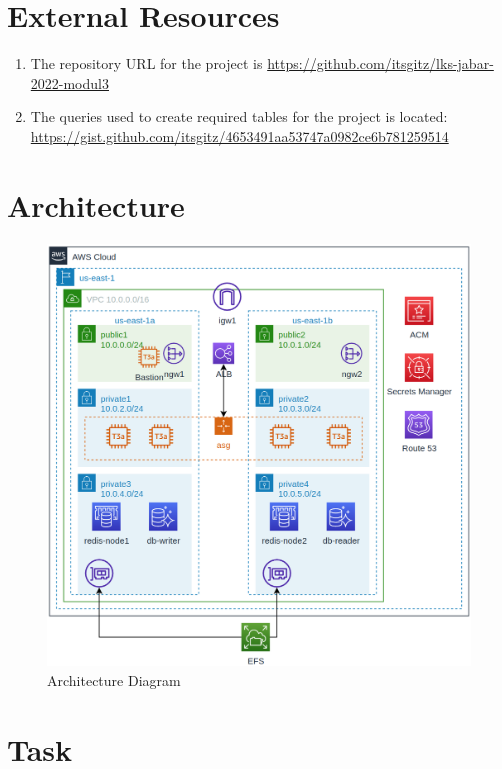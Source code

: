 \documentclass{article}
\begin{document}
\section{External Resources}\label{resources}
\begin{enumerate}
  \item The repository URL for the project is \href{https://github.com/itsgitz/lks-jabar-2022-modul3}{https://github.com/itsgitz/lks-jabar-2022-modul3}
  \item The queries used to create required tables for the project is located: \href{https://gist.github.com/itsgitz/4653491aa53747a0982ce6b781259514}{https://gist.github.com/itsgitz/4653491aa53747a0982ce6b781259514}
\end{enumerate}

\newpage

\section{Architecture}
\begin{figure}[h]
\centering
\includegraphics[width=\textwidth]{modul3_architecture.png}
\caption{\label{fig:architecture}Architecture Diagram}
\end{figure}

\section{Task}
\end{document}
